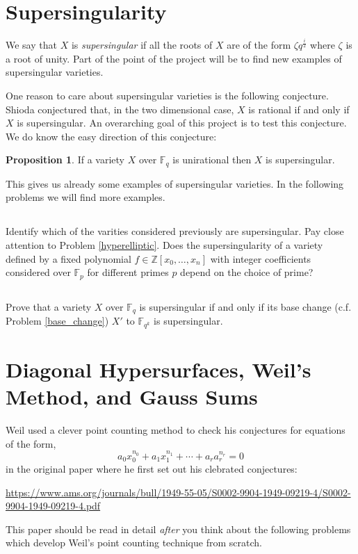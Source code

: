 \documentclass[12pt]{article}
\newcommand{\ZZ}{\mathbb{Z}}
\newcommand{\FF}{\mathbb{F}}
\theoremstyle{remark}
\theoremstyle{definition}
\newtheorem{prop}[theorem]{Proposition}
\begin{document}
\section{Supersingularity}

We say that $X$ is \textit{supersingular} if all the roots of $X$ are of the form $\zeta q^{\frac{i}{2}}$ where $\zeta$ is a root of unity. Part of the point of the project will be to find new examples of supersingular varieties. 
\par
One reason to care about supersingular varieties is the following conjecture. Shioda \cite{shioda_conjecture} conjectured that, in the two dimensional case, $X$ is rational if and only if $X$ is supersingular. An overarching goal of this project is to test this conjecture. We do know the easy direction of this conjecture:

\begin{prop}
If a variety $X$ over $\FF_q$ is unirational then $X$ is supersingular. 
\end{prop}

This gives us already some examples of supersingular varieties. In the following problems we will find more examples.

\subsection{}

Identify which of the varities considered previously are supersingular. Pay close attention to Problem \ref{hyperelliptic}. Does the supersingularity of a variety defined by a fixed polynomial $f \in \ZZ[x_0, \dots, x_n]$ with integer coefficients considered over $\FF_p$ for different primes $p$ depend on the choice of prime? 

\subsection{}

Prove that a variety $X$ over $\FF_q$ is supersingular if and only if its base change (c.f. Problem \ref{base_change}) $X'$ to $\FF_{q^k}$ is supersingular.

\section{Diagonal Hypersurfaces, Weil's Method, and Gauss Sums}

Weil used a clever point counting method to check his conjectures for equations of the form,
\[ a_0 x_0^{n_0} + a_1 x_1^{n_1} + \cdots + a_r a_r^{n_r} = 0 \]
in the original paper where he first set out his clebrated conjectures:
\begin{center}
\url{https://www.ams.org/journals/bull/1949-55-05/S0002-9904-1949-09219-4/S0002-9904-1949-09219-4.pdf}
\end{center}
This paper should be read in detail \textit{after} you think about the following problems which develop Weil's point counting technique from scratch.
\end{document}
